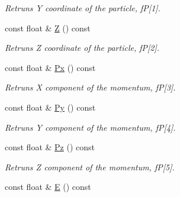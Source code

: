 \begin{DoxyCompactItemize}
\begin{DoxyCompactList}\small\item\em Retruns Y coordinate of the particle, fP\mbox{[}1\mbox{]}. \end{DoxyCompactList}\item 
const float \& \hyperlink{classKFParticleBase_a96e631c939d83ff67c82701ed8255200}{Z} () const \hypertarget{classKFParticleBase_a96e631c939d83ff67c82701ed8255200}{}\label{classKFParticleBase_a96e631c939d83ff67c82701ed8255200}

\begin{DoxyCompactList}\small\item\em Retruns Z coordinate of the particle, fP\mbox{[}2\mbox{]}. \end{DoxyCompactList}\item 
const float \& \hyperlink{classKFParticleBase_af8db96ad4e18b8c37444ab5d8967ad4b}{Px} () const \hypertarget{classKFParticleBase_af8db96ad4e18b8c37444ab5d8967ad4b}{}\label{classKFParticleBase_af8db96ad4e18b8c37444ab5d8967ad4b}

\begin{DoxyCompactList}\small\item\em Retruns X component of the momentum, fP\mbox{[}3\mbox{]}. \end{DoxyCompactList}\item 
const float \& \hyperlink{classKFParticleBase_a3e909ce013348a9560c6b4f4a195f99c}{Py} () const \hypertarget{classKFParticleBase_a3e909ce013348a9560c6b4f4a195f99c}{}\label{classKFParticleBase_a3e909ce013348a9560c6b4f4a195f99c}

\begin{DoxyCompactList}\small\item\em Retruns Y component of the momentum, fP\mbox{[}4\mbox{]}. \end{DoxyCompactList}\item 
const float \& \hyperlink{classKFParticleBase_a6323524db7fc97f61d8d77c0ccc362de}{Pz} () const \hypertarget{classKFParticleBase_a6323524db7fc97f61d8d77c0ccc362de}{}\label{classKFParticleBase_a6323524db7fc97f61d8d77c0ccc362de}

\begin{DoxyCompactList}\small\item\em Retruns Z component of the momentum, fP\mbox{[}5\mbox{]}. \end{DoxyCompactList}\item 
const float \& \hyperlink{classKFParticleBase_aa2f891df3d70ddcfdb32b67915c09e4b}{E} () const \hypertarget{classKFParticleBase_aa2f891df3d70ddcfdb32b67915c09e4b}{}\label{classKFParticleBase_aa2f891df3d70ddcfdb32b67915c09e4b}


\end{DoxyCompactItemize}
